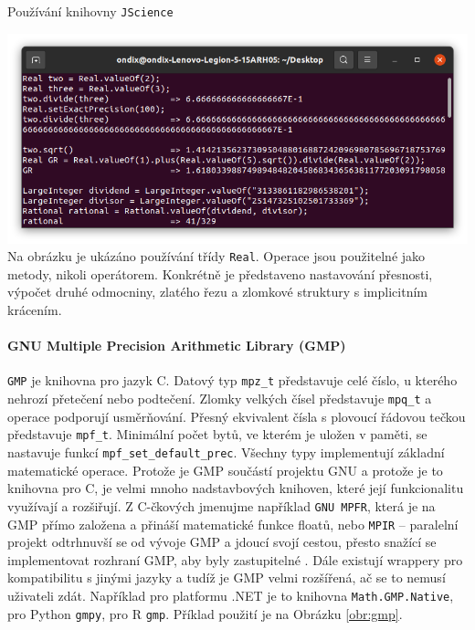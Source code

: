 \begin{myfigure}{}
\caption{Používání knihovny \texttt{JScience}}
\includegraphics[width=\linewidth]{./graphics/jscience.png}\label{obr:jscience}
Na obrázku je ukázáno používání třídy \texttt{Real}. Operace jsou použitelné jako metody, nikoli operátorem. Konkrétně je představeno nastavování přesnosti, výpočet druhé odmocniny, zlatého řezu a zlomkové struktury s implicitním krácením.
\end{myfigure}

\paragraph{GNU Multiple Precision Arithmetic Library \cite{wiki:gmp} (GMP)}
\texttt{GMP} je knihovna pro jazyk C. Datový typ \texttt{mpz\_t} představuje celé číslo, u kterého nehrozí přetečení nebo podtečení. Zlomky velkých čísel představuje \texttt{mpq\_t} a operace podporují usměrňování. Přesný ekvivalent čísla s plovoucí řádovou tečkou představuje \texttt{mpf\_t}. Minimální počet bytů, ve kterém je uložen v paměti, se nastavuje funkcí \texttt{mpf\_set\_default\_prec}. Všechny typy implementují základní matematické operace. Protože je GMP součástí projektu GNU a protože je to knihovna pro C, je velmi mnoho nadstavbových knihoven, které její funkcionalitu využívají a rozšiřují. Z C-čkových jmenujme například \texttt{GNU MPFR}, která je na GMP přímo založena \cite{wiki:mpfr} a přináší matematické funkce floatů, nebo \texttt{MPIR} -- paralelní projekt odtrhnuvší se od vývoje GMP a jdoucí svojí cestou, přesto snažící se implementovat rozhraní GMP, aby byly zastupitelné \cite{wiki:mpir}. Dále existují wrappery pro kompatibilitu s jinými jazyky a tudíž je GMP velmi rozšířená, ač se to nemusí uživateli zdát. Například pro platformu .NET je to knihovna \texttt{Math.GMP.Native}, pro Python \texttt{gmpy}, pro R \texttt{gmp}. Příklad použití je na Obrázku \ref{obr:gmp}.

